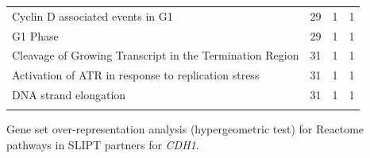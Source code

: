 \begin{table}[!ht]
{\begin{threeparttable}
\begin{tabular}{lccc}
  \rowcolor{black!5}
  Cyclin D associated events in G1 &  29 &   1 &   1 \\ 
  \rowcolor{black!10}
  G1 Phase &  29 &   1 &   1 \\ 
  \rowcolor{black!5}
  Cleavage of Growing Transcript in the Termination Region &  31 &   1 &   1 \\ 
  \rowcolor{black!10}
  Activation of ATR in response to replication stress &  31 &   1 &   1 \\ 
  \rowcolor{black!5}
  \acrshort{DNA} strand elongation &  31 &   1 &   1 \\ 
  \rowcolor{black!10}
  \hline
\end{tabular}
\begin{tablenotes}
\raggedright \small
Gene set over-representation analysis (hypergeometric test) for Reactome pathways in SLIPT partners for \textit{CDH1}.
\end{tablenotes}
\end{threeparttable}
}
\end{table}


